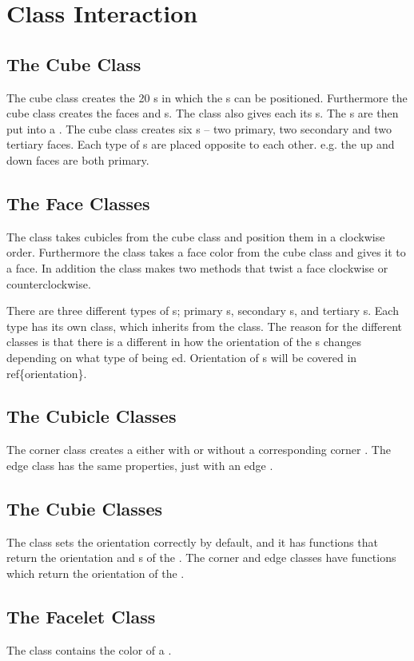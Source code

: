 \section{Class Interaction}
\myTop{}
\subsection{The Cube Class}
The cube class creates the 20 \cubicle{}s in which the \cpiece{}s can be positioned. Furthermore the cube class creates the faces and \cubie{}s. The class also gives each \cpiece{} its \facelet{}s. The \cubie{}s are then put into a \face{}. The cube class creates six \face{}s -- two primary, two secondary and two tertiary faces. Each type of \face{}s are placed opposite to each other. e.g. the up and down faces are both primary.
\subsection{The Face Classes}
The \face{} class takes cubicles from the cube class and position them in a clockwise order. Furthermore the \face{} class takes a face color from the cube class and gives it to a face. In addition the \face{} class makes two methods that twist a face clockwise or counterclockwise.

There are three different types of \face{}s; primary \face{}s, secondary \face{}s, and tertiary \face{}s.
Each type has its own class, which inherits from the \face{} class.
The reason for the different classes is that there is a different in how the orientation of the \cubie{}s changes depending on what type of \face{} being \twist{}ed.
Orientation of \cubie{}s will be covered in ref\{orientation\}.
\subsection{The Cubicle Classes}
The corner \cubicle{} class creates a \cubicle{} either with or without a corresponding corner \cpiece{}. The edge \cubicle{} class has the same properties, just with an edge \cubicle{}.
\subsection{The Cubie Classes}
The \cpiece{} class sets the orientation correctly by default, and it has functions that return the orientation and \facelet{}s of the \cpiece{}. The corner and edge \cpiece{} classes have functions which return the orientation of the \cpiece{}.
\subsection{The Facelet Class}
The \facelet{} class contains the color of a \facelet{}.
\myTail{}